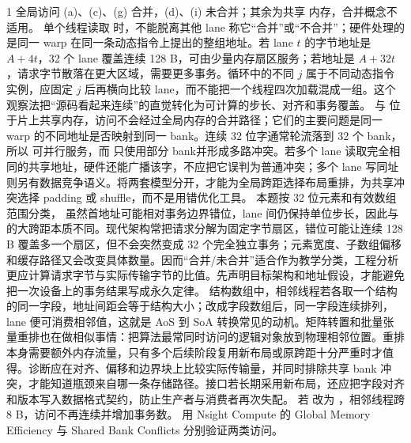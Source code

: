 \begin{solutionexercise}{1}
\conclusionheading 全局访问 (a)、(c)、(g) 合并，(d)、(i) 未合并；其余为共享
内存，合并概念不适用。
\discussionheading
{}
单个线程读取  时，不能脱离其他 lane 称它“合并”或“不合并”；硬件处理的是同一 warp 在同一条动态指令上提出的整组地址。若 lane $t$ 的字节地址是 $A+4t$，32 个 lane 覆盖连续 128 B，可由少量内存扇区服务；若地址是 $A+32t$，请求字节散落在更大区域，需要更多事务。循环中的不同 $j$ 属于不同动态指令实例，应固定 $j$ 后再横向比较 lane，而不能把一个线程四次加载混成一组。这个观察法把“源码看起来连续”的直觉转化为可计算的步长、对齐和事务覆盖。
 与  位于片上共享内存，访问不会经过全局内存的合并路径；它们的主要问题是同一 warp 的不同地址是否映射到同一 bank。连续 32 位字通常轮流落到 32 个 bank，所以  可并行服务，而  只使用部分 bank并形成多路冲突。若多个 lane 读取完全相同的共享地址，硬件还能广播该字，不应把它误判为普通冲突；多个 lane 写同址则另有数据竞争语义。将两套模型分开，才能为全局跨距选择布局重排，为共享冲突选择 padding 或 shuffle，而不是用错优化工具。
本题按 32 位元素和有效数组范围分类， 虽然首地址可能相对事务边界错位，lane 间仍保持单位步长，因此与  的大跨距本质不同。现代架构常把请求分解为固定字节扇区，错位可能让连续 128 B 覆盖多一个扇区，但不会突然变成 32 个完全独立事务；元素宽度、子数组偏移和缓存路径又会改变具体数量。因而“合并/未合并”适合作为教学分类，工程分析更应计算请求字节与实际传输字节的比值。先声明目标架构和地址假设，才能避免把一次设备上的事务结果写成永久定律。
结构数组中，相邻线程若各取一个结构的同一字段，地址间距会等于结构大小；改成字段数组后，同一字段连续排列，lane 便可消费相邻值，这就是 AoS 到 SoA 转换常见的动机。矩阵转置和批量张量重排也在做相似事情：把算法最常同时访问的逻辑对象放到物理相邻位置。重排本身需要额外内存流量，只有多个后续阶段复用新布局或原跨距十分严重时才值得。诊断应在对齐、偏移和边界块上比较实际传输量，并同时排除共享 bank 冲突，才能知道瓶颈来自哪一条存储路径。接口若长期采用新布局，还应把字段对齐和版本写入数据格式契约，防止生产者与消费者再次失配。
\variantheading 若  改为 ，相邻线程跨 8 B，访问不再连续并增加事务数。
\practiceheading 用 Nsight Compute 的 Global Memory Efficiency 与 Shared Bank Conflicts 分别验证两类访问。
\end{solutionexercise}

